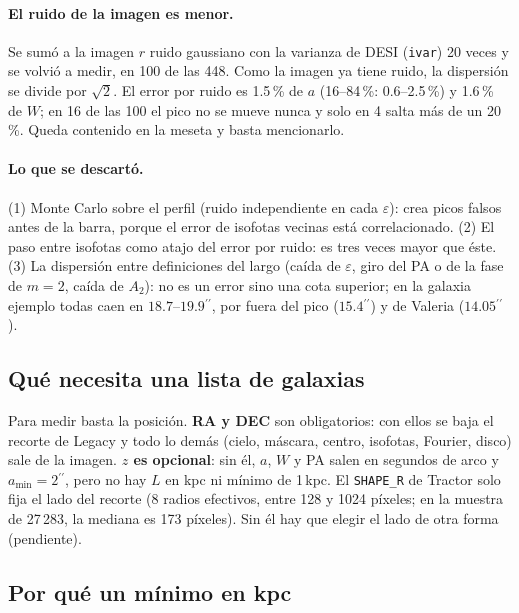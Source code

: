 \documentclass[11pt,a4paper]{article}
\newcommand{\as}{\ensuremath{^{\prime\prime}}}
\newcommand{\code}[1]{\texttt{#1}}
\begin{document}
\paragraph{El ruido de la imagen es menor.} Se sumó a la imagen $r$ ruido gaussiano con la varianza de DESI
(\code{ivar}) 20 veces y se volvió a medir, en 100 de las 448. Como la imagen ya tiene ruido, la dispersión se
divide por $\sqrt{2}$. El error por ruido es 1.5\,\% de $a$ (16--84\,\%: 0.6--2.5\,\%) y 1.6\,\% de $W$; en 16 de
las 100 el pico no se mueve nunca y solo en 4 salta más de un 20\,\%. Queda contenido en la meseta y basta
mencionarlo.

\paragraph{Lo que se descartó.} (1) Monte Carlo sobre el perfil (ruido independiente en cada $\varepsilon$): crea
picos falsos antes de la barra, porque el error de isofotas vecinas está correlacionado. (2) El paso entre isofotas
como atajo del error por ruido: es tres veces mayor que éste. (3) La dispersión entre definiciones del largo (caída
de $\varepsilon$, giro del PA o de la fase de $m=2$, caída de $A_2$): no es un error sino una cota superior; en la
galaxia ejemplo todas caen en $18.7$--$19.9\as$, por fuera del pico ($15.4\as$) y de Valeria ($14.05\as$).

\subsection{Qué necesita una lista de galaxias}\label{sec:lista}

Para medir basta la posición. \textbf{RA y DEC} son obligatorios: con ellos se baja el recorte de Legacy y todo
lo demás (cielo, máscara, centro, isofotas, Fourier, disco) sale de la imagen. \textbf{$z$ es opcional}: sin él,
$a$, $W$ y PA salen en segundos de arco y $a_{\min} = 2\as$, pero no hay $L$ en kpc ni mínimo de 1\,kpc. El
\code{SHAPE\_R} de Tractor solo fija el lado del recorte (8 radios efectivos, entre 128 y 1024 píxeles; en la
muestra de 27\,283, la mediana es 173 píxeles). Sin él hay que elegir el lado de otra forma (pendiente).

\subsection{Por qué un mínimo en kpc}
\end{document}
